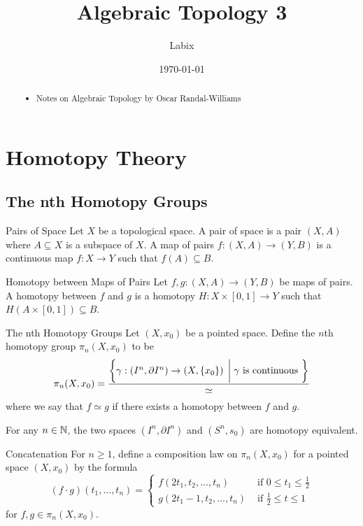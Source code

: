 \documentclass[a4paper]{article}
\title{Algebraic Topology 3}
\author{Labix}
\date{\today}
\begin{document}
\maketitle
\begin{abstract}
\begin{itemize}
\item Notes on Algebraic Topology by Oscar Randal-Williams
\end{itemize}
\end{abstract}
\pagebreak
\tableofcontents

\pagebreak

\section{Homotopy Theory}
\subsection{The nth Homotopy Groups}
\begin{defn}{Pairs of Space}{} Let $X$ be a topological space. A pair of space is a pair $(X,A)$ where $A\subseteq X$ is a subspace of $X$. A map of pairs $f:(X,A)\to(Y,B)$ is a continuous map $f:X\to Y$ such that $f(A)\subseteq B$. 
\end{defn}

\begin{defn}{Homotopy between Maps of Pairs}{} Let $f,g:(X,A)\to (Y,B)$ be maps of pairs. A homotopy between $f$ and $g$ is a homotopy $H:X\times[0,1]\to Y$ such that $H(A\times[0,1])\subseteq B$. 
\end{defn}

\begin{defn}{The nth Homotopy Groups}{} Let $(X,x_0)$ be a pointed space. Define the $n$th homotopy group $\pi_n(X,x_0)$ to be $$\pi_n(X,x_0)=\frac{\left\{\gamma:\left(I^n,\partial I^n\right)\to\left(X,\{x_0\}\right)\;\bigg{|}\;\gamma\text{ is continuous }\right\}}{\simeq}$$ where we say that $f\simeq g$ if there exists a homotopy between $f$ and $g$. 
\end{defn}

\begin{lmm}{}{} For any $n\in\mathbb{N}$, the two spaces $(I^n,\partial I^n)$ and $(S^n,s_0)$ are homotopy equivalent. 
\end{lmm}

\begin{defn}{Concatenation}{} For $n\geq 1$, define a composition law on $\pi_n(X,x_0)$ for a pointed space $(X,x_0)$ by the formula $$(f\cdot g)(t_1,\dots,t_n)=\begin{cases}
f(2t_1,t_2,\dots,t_n) & \text{ if } 0\leq t_1\leq\frac{1}{2}\\
g(2t_1-1,t_2,\dots,t_n) & \text{ if } \frac{1}{2}\leq t\leq 1
\end{cases}$$ for $f,g\in\pi_n(X,x_0)$. 
\end{defn}
\end{document}
